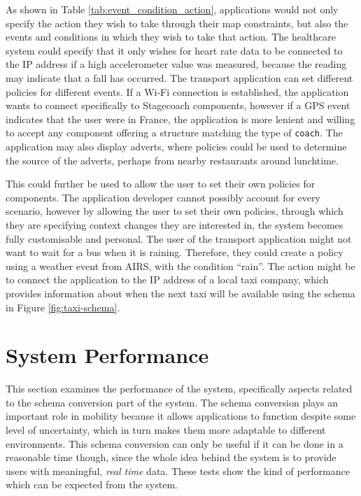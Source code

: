 \documentclass[12pt,twoside,notitlepage]{report}
\begin{document}
As shown in Table \ref{tab:event_condition_action}, applications would not only specify the action they wish to take through their map constraints, but also the events and conditions in which they wish to take that action.
The healthcare system could specify that it only wishes for heart rate data to be connected to the IP address if a high accelerometer value was measured, because the reading may indicate that a fall has occurred. 
The transport application can set different policies for different events. If a Wi-Fi connection is established, the application wants to connect specifically to Stagecoach components, however if a GPS event indicates that the user were in France, the application is more lenient and willing to accept any component offering a structure matching the type of {\tt coach}. 
The application may also display adverts, where policies could be used to determine the source of the adverts, perhaps from nearby restaurants around lunchtime. 

This could further be used to allow the user to set their own policies for components. 
The application developer cannot possibly account for every scenario, however by allowing the user to set their own policies, through which they are specifying context changes they are interested in, the system becomes fully customisable and personal. 
The user of the transport application might not want to wait for a bus when it is raining. 
Therefore, they could create a policy using a weather event from AIRS, with the condition ``rain''. 
The action might be to connect the application to the IP address of a local taxi company, which provides information about when the next taxi will be available using the schema in Figure \ref{fig:taxi-schema}.





\section{System Performance}

This section examines the performance of the system, specifically aspects related to the schema conversion part of the system. 
The schema conversion plays an important role in mobility because it allows applications to function despite some level of uncertainty, which in turn makes them more adaptable to different environments. 
This schema conversion can only be useful if it can be done in a reasonable time though, since the whole idea behind the system is to provide users with meaningful, {\sl real time} data. 
These tests show the kind of performance which can be expected from the system. 
\end{document}
